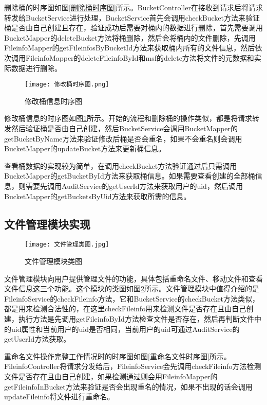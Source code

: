 删除桶的时序图如图\ref{删除桶时序图}所示。BucketController在接收到请求后将请求转发给BucketService进行处理，BucketService首先会调用checkBucket方法来验证桶是否由自己创建且存在，验证成功后需要对桶内的数据进行删除，首先需要调用BucketMapper的deleteBucket方法将桶删除，然后会将桶内的文件删除，先调用FileinfoMapper的getFileinfosByBucketId方法来获取桶内所有的文件信息，然后依次调用FileinfoMapper的deleteFileinfoById和msf的delete方法将文件的元数据和实际数据进行删除。

\begin{figure}
  \centering
  \texttt{[image: 修改桶时序图.png]}
  \caption{修改桶信息时序图}
  \label{修改桶信息时序图}
\end{figure}

修改桶信息的时序图如图\ref{修改桶信息时序图}所示。开始的流程和删除桶的操作类似，都是将请求转发然后验证桶是否由自己创建，然后BucketService会调用BucketMapper的getBucketByName方法来验证修改后桶是否会重名，如果不会重名则会调用BucketMapper的updateBucket方法来更新桶信息。

查看桶数据的实现较为简单，在调用checkBucket方法验证通过后只需调用BucketMapper的getBucketById方法来获取桶信息。如果需要查看创建的全部桶信息，则需要先调用AuditService的getUserId方法来获取用户的uid，然后调用BucketMapper的getBucketsByUid方法来获取所需的信息。

\subsection{文件管理模块实现} 

\begin{figure}
  \centering
  \texttt{[image: 文件管理类图.jpg]}
  \caption{文件管理模块类图}
  \label{文件管理模块类图}
\end{figure}

文件管理模块向用户提供管理文件的功能，具体包括重命名文件、移动文件和查看文件信息这三个功能。这个模块的类图如图\ref{文件管理模块类图}所示。文件管理模块中值得介绍的是FileinfoService的checkFileinfo方法，它和BucketService的checkBucket方法类似，都是用来检测合法性的，在这里checkFileinfo用来检测文件是否存在且由自己创建，执行方法是先调用getFileinfoById方法检查文件是否存在，然后再判断文件中的uid属性和当前用户的uid是否相同，当前用户的uid可通过AuditService的getUserId方法获取。

重命名文件操作完整工作情况时的时序图如图\ref{重命名文件时序图}所示。FileinfoController将请求分发给后，FileinfoService会先调用checkFileinfo方法检测文件是否存在且由自己创建，如果检测通过则会用FileinfoMapper的getFileinfoInBucket方法来验证是否会出现重名的情况，如果不出现的话会调用updateFileinfo将文件进行重命名。\newline \newline \newline 

